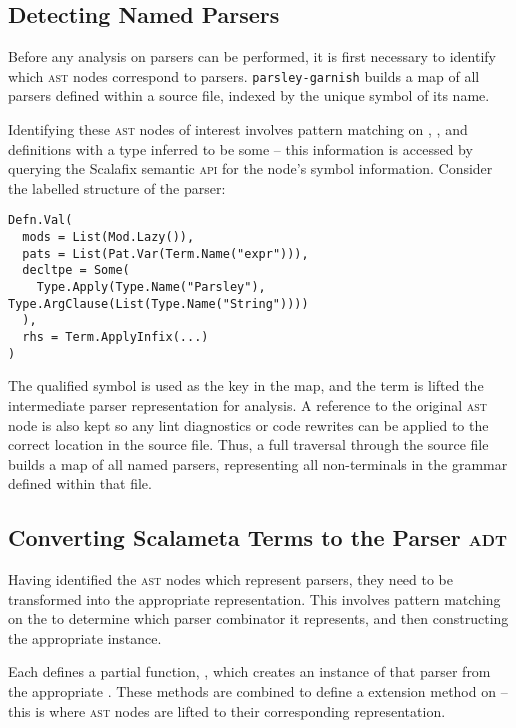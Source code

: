 \documentclass[../../../main.tex]{subfiles}
\begin{document}
\subsection{Detecting Named Parsers}
Before any analysis on parsers can be performed, it is first necessary to identify which \textsc{ast} nodes correspond to parsers.
\texttt{parsley-garnish} builds a map of all parsers defined within a source file, indexed by the unique symbol of its name.

Identifying these \textsc{ast} nodes of interest involves pattern matching on , , and  definitions with a type inferred to be some  -- this information is accessed by querying the Scalafix semantic \textsc{api} for the node's symbol information.
Consider the labelled  structure of the  parser:
\begin{verbatim}
Defn.Val(
  mods = List(Mod.Lazy()),
  pats = List(Pat.Var(Term.Name("expr"))),
  decltpe = Some(
    Type.Apply(Type.Name("Parsley"), Type.ArgClause(List(Type.Name("String"))))
  ),
  rhs = Term.ApplyInfix(...)
)
\end{verbatim}
%
The qualified symbol  is used as the key in the map, and the  term is lifted the intermediate parser representation for analysis.
A reference to the original \textsc{ast} node is also kept so any lint diagnostics or code rewrites can be applied to the correct location in the source file.
Thus, a full traversal through the source file builds a map of all named parsers, representing all non-terminals in the grammar defined within that file.

\subsection{Converting Scalameta Terms to the Parser \textsc{adt}}
Having identified the \textsc{ast} nodes which represent parsers, they need to be transformed into the appropriate  representation.
This involves pattern matching on the  to determine which parser combinator it represents, and then constructing the appropriate  instance.

Each  defines a partial function, , which creates an instance of that parser from the appropriate .
These  methods are combined to define a  extension method on  -- this is where \textsc{ast} nodes are lifted to their corresponding  representation.
\end{document}
